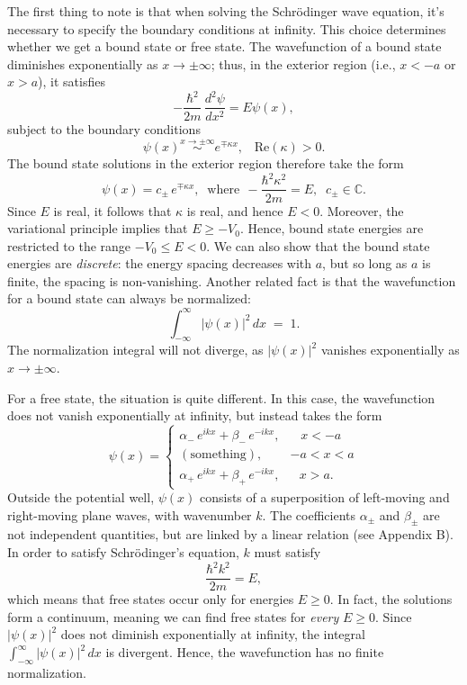 \documentclass[pra,12pt]{revtex4}
\begin{document}
The first thing to note is that when solving the Schr\"odinger wave
equation, it's necessary to specify the boundary conditions at
infinity.  This choice determines whether we get a bound state or free
state.  The wavefunction of a bound state diminishes exponentially as
$x \rightarrow \pm\infty$; thus, in the exterior region (i.e., $x <
-a$ or $x > a$), it satisfies
$$-\frac{\hbar^2}{2m}\,\frac{d^2\psi}{dx^2} = E \psi(x),$$
subject to the boundary conditions
$$\psi(x) \overset{x\rightarrow\pm\infty}{\sim} e^{\mp\kappa x}, \;\;\;\mathrm{Re}(\kappa) > 0.$$
The bound state solutions in the exterior region therefore take the
form
$$\psi(x) = c_\pm\, e^{\mp\kappa x}, \;\;\mathrm{where}\;\, -\frac{\hbar^2\kappa^2}{2m} = E, \;\; c_\pm \in \mathbb{C}.$$
Since $E$ is real, it follows that $\kappa$ is real, and hence $E <
0$.  Moreover, the variational principle implies that $E \ge -V_0$.
Hence, bound state energies are restricted to the range $-V_0 \le E <
0$.  We can also show that the bound state energies are
\textit{discrete}: the energy spacing decreases with $a$, but so long
as $a$ is finite, the spacing is non-vanishing.  Another related
fact is that the wavefunction for a bound state can always be
normalized:
$$\int_{-\infty}^\infty |\psi(x)|^2\, dx\; =\; 1.$$
The normalization integral will not diverge, as $|\psi(x)|^2$ vanishes
exponentially as $x \rightarrow \pm \infty$.

For a free state, the situation is quite different.  In this case, the
wavefunction does not vanish exponentially at infinity, but instead
takes the form
$$\psi(x) = \begin{cases} \alpha_-\, e^{ik x} + \beta_-\, e^{-ik x}, & \;\;\;x < -a\\ (\mathrm{something}) , & -a < x < a\\ \alpha_+\, e^{ik x} + \beta_+\, e^{-ik x} , & \;\;\,x > a.\end{cases}$$
Outside the potential well, $\psi(x)$ consists of a superposition of
left-moving and right-moving plane waves, with wavenumber $k$.  The
coefficients $\alpha_\pm$ and $\beta_\pm$ are not independent
quantities, but are linked by a linear relation (see Appendix B).  In
order to satisfy Schr\"odinger's equation, $k$ must satisfy
$$\frac{\hbar^2k^2}{2m} = E,$$
which means that free states occur only for energies $E \ge 0$.  In
fact, the solutions form a continuum, meaning we can find free states
for \textit{every} $E \ge 0$.  Since $|\psi(x)|^2$ does not diminish
exponentially at infinity, the integral $\int_{-\infty}^\infty
|\psi(x)|^2\, dx$ is divergent.  Hence, the wavefunction has no finite
normalization.
\end{document}
